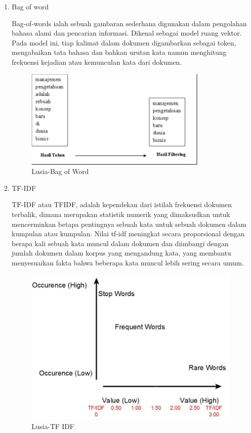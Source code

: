 \begin{enumerate}
\item Bag of word
	\par Bag-of-words ialah sebuah gambaran sederhana digunakan dalam pengolahan bahasa alami dan pencarian informasi. Dikenal sebagai model ruang vektor. Pada model ini, tiap kalimat dalam dokumen digambarkan sebagai token, mengabaikan tata bahasa dan bahkan urutan kata namun menghitung frekuensi kejadian atau kemunculan kata dari dokumen.
	\begin{figure}[ht]
		\centering
		\includegraphics[scale=0.5]{figures/AFS/k4.png}
		\caption{Lusia-Bag of Word}
		\label{contoh}
	\end{figure}
	
\item TF-IDF
	\par TF-IDF atau TFIDF, adalah kependekan dari istilah frekuensi dokumen terbalik, dimana merupakan statistik numerik yang dimaksudkan untuk mencerminkan betapa pentingnya sebuah kata untuk sebuah dokumen dalam kumpulan atau kumpulan. Nilai tf-idf meningkat secara proporsional dengan berapa kali sebuah kata muncul dalam dokumen dan diimbangi dengan jumlah dokumen dalam korpus yang mengandung kata, yang membantu menyesuaikan fakta bahwa beberapa kata muncul lebih sering secara umum.
	\begin{figure}[ht]
		\centering
		\includegraphics[scale=0.5]{figures/AFS/k5.jpeg}
		\caption{Lusia-TF IDF}
		\label{contoh}
	\end{figure}
\end{enumerate}